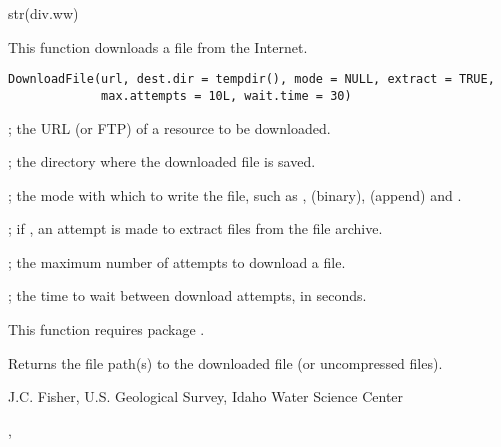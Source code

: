 \documentclass[letterpaper]{book}
\begin{document}
%
\begin{Examples}
\begin{ExampleCode}
str(div.ww)
\end{ExampleCode}
\end{Examples}
%
\begin{Description}\relax
This function downloads a file from the Internet.
\end{Description}
%
\begin{Usage}
\begin{verbatim}
DownloadFile(url, dest.dir = tempdir(), mode = NULL, extract = TRUE,
             max.attempts = 10L, wait.time = 30)
\end{verbatim}
\end{Usage}
%
\begin{Arguments}
\begin{ldescription}
\item[\code{url}] ; the URL (or FTP) of a resource to be downloaded.
\item[\code{dest.dir}] ; the directory where the downloaded file is saved.
\item[\code{mode}] ; the mode with which to write the file, such as ,  (binary),  (append) and .
\item[\code{extract}] ; if , an attempt is made to extract files from the file archive.
\item[\code{max.attempts}] ; the maximum number of attempts to download a file.
\item[\code{wait.time}] ; the time to wait between download attempts, in seconds.
\end{ldescription}
\end{Arguments}
%
\begin{Details}\relax
This function requires package .
\end{Details}
%
\begin{Value}
Returns the file path(s) to the downloaded file (or uncompressed files).
\end{Value}
%
\begin{Author}\relax
J.C. Fisher, U.S. Geological Survey, Idaho Water Science Center
\end{Author}
%
\begin{SeeAlso}\relax
{}, 
\end{SeeAlso}
\end{document}
